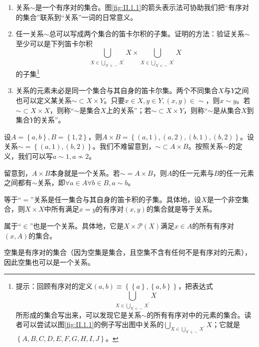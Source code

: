 \documentclass[../main.tex]{subfiles}
\begin{document}
\begin{enumerate}
    \item 关系$\sim$是一个有序对的集合。图\ref{fig:II.1.1}的箭头表示法可协助我们把“有序对的集合”联系到“关系”一词的日常意义。
    \item 任一关系$\sim$总可以写成两个集合的笛卡尔积的子集。证明的方法：验证关系$\sim$至少可以是下列笛卡尔积
          \[
              \bigcup_{X\in\bigcup_{X^\prime\in\sim}X^\prime}X \times\bigcup_{X\in\bigcup_{X^\prime\in\sim}X^\prime}X
          \]
          的子集\footnote{提示：回顾有序对的定义$\left(a,b\right)\equiv\left\{\left\{a\right\},\left\{a,b\right\}\right\}$，把表达式
              \[
                  \bigcup_{X\in\bigcup_{X^\prime\in\sim}X^\prime}X
              \]
              所形成的集合写出来，可以发现它是关系$\sim$的所有有序对中的元素的集合。读者可以尝试以图\ref{fig:II.1.1}的例子写出图中关系的$\bigcup_{X\in\bigcup_{X^\prime\in\sim}X^\prime}X$；它就是$\left\{A,B,C,D,E,F,G,H,I,J\right\}$。}
    \item 关系的元素未必是同一个集合与其自身的笛卡尔集。两个不同集合$X$与$Y$之间也可以定义某关系$\sim\subset X\times Y$。只要$x\in X,y\in Y,\left(x,y\right)\in\sim$，则$x\sim y$。若$\sim\subset X\times X$，则称“$\sim$是集合$X$上的关系”；若$\sim\subset X\times Y$，则称“$\sim$是从集合$X$到集合$Y$的关系”。
\end{enumerate}

\begin{example}
    设$A=\left\{a,b\right\}, B=\left\{1,2\right\}$，则$A\times B=\left\{\left(a,1\right),\left(a,2\right),\left(b,1\right),\left(b,2\right)\right\}$。设关系$\sim=\left\{\left(a,1\right),\left(b,2\right)\right\}$。我们不难留意到，$\sim\subset A\times B$。按照关系$\sim$的定义，我们可以写$a\sim 1,a\not\sim 2$。

    留意到，$A\times B$本身就是一个关系。若$\sim=A\times B$，则$A$的任一元素与$B$的任一元素之间都有$\sim$关系，即$\forall a\in A\forall b\in B,a\sim b$。

    等于“$=$”关系是任一集合与其自身的笛卡积的子集。具体地，设$X$是一个非空集合，则$X\times X$中所有满足$x=y$的有序对$\left(x,y\right)$的集合就是等于关系。

    属于“$\in$”也是一个关系。具体地，它是$X\times\mathcal{P}\left(X\right)$满足$x\in A$的所有有序对$\left(x,A\right)$的集合。

    空集是有序对的集合（因为空集是集合，且空集不含有任何不是有序对的元素），因此空集也可以是一个关系。
\end{example}
\end{document}
